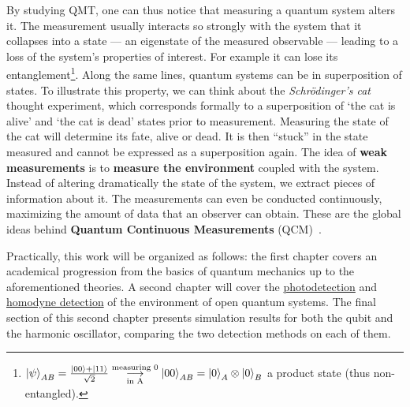 By studying QMT, one can thus notice that measuring a quantum system alters it. The measurement usually interacts so strongly with the system that it collapses into a state --- an eigenstate of the measured observable --- leading to a loss of the system's properties of interest. For example it can lose its entanglement\footnote{
    $\ket{\psi}_{AB}=\frac{\ket{00}+\ket{11}}{\sqrt{2}}\underset{\text{in A}}{\overset{\text{measuring 0}}{\longrightarrow}}\ket{00}_{AB}=\ket{0}_A\otimes\ket{0}_B$ a product state (thus non-entangled).
}. Along the same lines, quantum systems can be in superposition of states. To illustrate this property, we can think about the \textit{Schrödinger's cat} thought experiment, which corresponds formally to a superposition of `the cat is alive' and `the cat is dead' states prior to measurement. Measuring the state of the cat will determine its fate, alive or dead. It is then ``stuck'' in the state measured and cannot be expressed as a superposition again.
The idea of \textbf{weak measurements} is to \textbf{measure the environment} coupled with the system. Instead of altering dramatically the state of the system, we extract pieces of information about it. The measurements can even be conducted continuously, maximizing the amount of data that an observer can obtain. These are the global ideas behind \textbf{Quantum Continuous Measurements} (QCM)~\cite{Albarelli}.

Practically, this work will be organized as follows: the first chapter covers an academical progression from the basics of quantum mechanics up to the aforementioned theories. A second chapter will cover the \underline{photodetection} and \underline{homodyne detection} of the environment of open quantum systems. The final section of this second chapter presents simulation results for both the qubit and the harmonic oscillator, comparing the two detection methods on each of them.